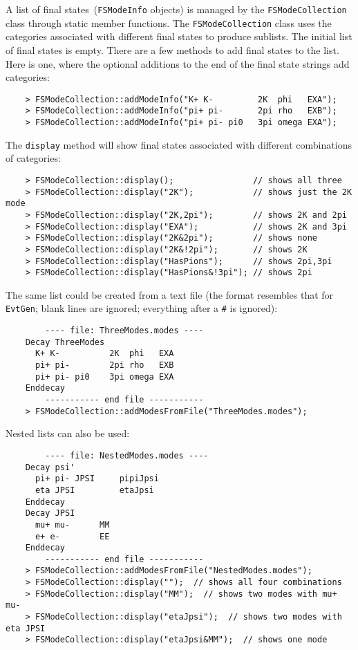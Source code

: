 \documentclass[11pt]{article}
\begin{document}
A list of final states~({\tt FSModeInfo} objects) is managed by the {\tt FSModeCollection} class through static member functions.  The {\tt FSModeCollection} class uses the categories associated with different final states to produce sublists.  The initial list of final states is empty.  There are a few methods to add final states to the list.  Here is one, where the optional additions to the end of the final state strings add categories:
\begin{verbatim}
    > FSModeCollection::addModeInfo("K+ K-         2K  phi   EXA");
    > FSModeCollection::addModeInfo("pi+ pi-       2pi rho   EXB");
    > FSModeCollection::addModeInfo("pi+ pi- pi0   3pi omega EXA");
\end{verbatim}

The {\tt display} method will show final states associated with different combinations of categories:
\begin{verbatim}
    > FSModeCollection::display();                // shows all three
    > FSModeCollection::display("2K");            // shows just the 2K mode
    > FSModeCollection::display("2K,2pi");        // shows 2K and 2pi
    > FSModeCollection::display("EXA");           // shows 2K and 3pi
    > FSModeCollection::display("2K&2pi");        // shows none
    > FSModeCollection::display("2K&!2pi");       // shows 2K
    > FSModeCollection::display("HasPions");      // shows 2pi,3pi
    > FSModeCollection::display("HasPions&!3pi"); // shows 2pi
\end{verbatim}

The same list could be created from a text file (the format resembles that for {\tt EvtGen}; blank lines are ignored; everything after a {\tt \#} is ignored):
\begin{verbatim}
        ---- file: ThreeModes.modes ----
    Decay ThreeModes
      K+ K-          2K  phi   EXA
      pi+ pi-        2pi rho   EXB
      pi+ pi- pi0    3pi omega EXA
    Enddecay
        ----------- end file -----------
    > FSModeCollection::addModesFromFile("ThreeModes.modes");
\end{verbatim}
Nested lists can also be used:
\begin{verbatim}
        ---- file: NestedModes.modes ----
    Decay psi'
      pi+ pi- JPSI     pipiJpsi
      eta JPSI         etaJpsi
    Enddecay
    Decay JPSI
      mu+ mu-      MM
      e+ e-        EE
    Enddecay
        ----------- end file -----------
    > FSModeCollection::addModesFromFile("NestedModes.modes");
    > FSModeCollection::display("");  // shows all four combinations 
    > FSModeCollection::display("MM");  // shows two modes with mu+ mu- 
    > FSModeCollection::display("etaJpsi");  // shows two modes with eta JPSI 
    > FSModeCollection::display("etaJpsi&MM");  // shows one mode 
\end{verbatim}
\end{document}
